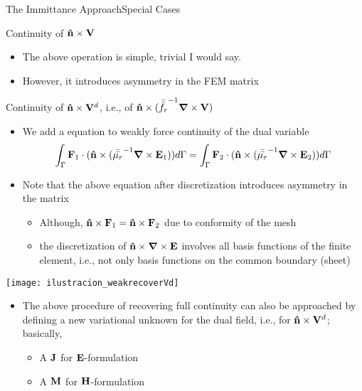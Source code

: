 \begin{frame}[allowframebreaks]{The Immittance Approach}{Special Cases}
\begin{block}{Continuity of  $\mathbf{\hat{n}}\times\mathbf{V}$}
\begin{itemize}
    \item The above operation is simple, trivial I would say.

    \item However,  it introduces asymmetry
      in the FEM matrix
      
    \end{itemize}
  \end{block}
  
  \framebreak  %

  \begin{block}{Continuity of $\mathbf{\hat{n}}\times\mathbf{V}^d$, i.e., of
      $\mathbf{\hat{n}}\times( {\bar{\bar{f_r}}}^{-1} \boldsymbol{\nabla} \times\mathbf{V})$}
    \begin{itemize}
    \item We add a equation to weakly force continuity of the dual variable
      \begin{equation}
        \label{eq:weakrecoverVd}
        \int_{\Gamma} \mathbf{F}_1\cdot(\mathbf{\hat{n}} \times ( {\bar{\bar{\mu_r}}}^{-1} \boldsymbol{\nabla} \times \mathbf{E}_1 )) d\Gamma = 
        \int_{\Gamma} \mathbf{F}_2\cdot(\mathbf{\hat{n}} \times ( {\bar{\bar{\mu_r}}}^{-1} \boldsymbol{\nabla} \times \mathbf{E}_2 )) d\Gamma 
      \end{equation}

    \item Note that the above equation after discretization introduces
      asymmetry in the matrix
      \begin{itemize}
      \item Although, $\mathbf{\hat{n}}\times\mathbf{F}_1=\mathbf{\hat{n}}\times\mathbf{F}_2$ due to
        conformity of the mesh
      \item the discretization of
        $\mathbf{\hat{n}} \times \boldsymbol{\nabla}\times\mathbf{E}$ involves all basis
        functions of the finite element, i.e., not only basis
        functions on the common boundary (sheet)
      \end{itemize}

      
    \end{itemize}
  \end{block}

  \framebreak  %

  \begin{center}
    \texttt{[image: ilustracion\_weakrecoverVd]}
  \end{center}
  
  \framebreak  %
  
  \begin{itemize}
  \item The above procedure of recovering full continuity can also be
    approached by defining a new variational unknown for the dual
    field, i.e., for $\mathbf{\hat{n}}\times\mathbf{V}^d$; basically,
    \begin{itemize}
    \item A $\mathbf{J}$ for $\mathbf{E}$-formulation
    \item A $\mathbf{M}$ for $\mathbf{H}$-formulation
    \end{itemize}
    

\end{itemize}
\end{frame}
